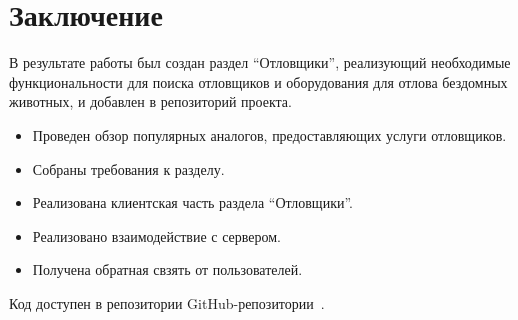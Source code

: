 
\section*{Заключение}
В результате работы был создан раздел \enquote{Отловщики}, реализующий необходимые функциональности для поиска отловщиков и оборудования для отлова бездомных животных, и добавлен в репозиторий проекта.
\begin{itemize}
    \item Проведен обзор популярных аналогов, предоставляющих услуги отловщиков.
    \item Собраны требования к разделу.
    \item Реализована клиентская часть раздела \enquote{Отловщики}.
    \item Реализовано взаимодействие с сервером.
    \item Получена обратная свзять от пользователей.
\end{itemize}

Код доступен в репозитории GitHub-репозитории~\cite{github}.
